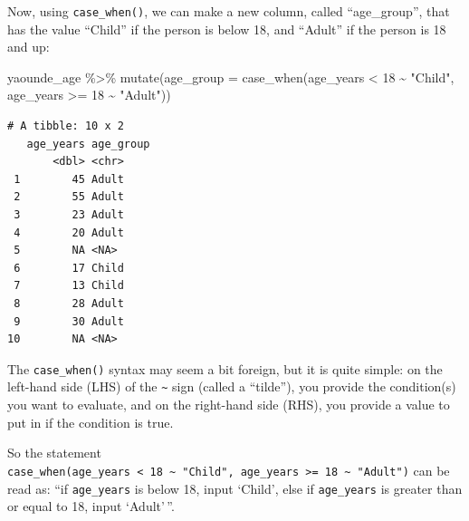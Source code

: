 \documentclass[
  letterpaper,
  DIV=11,
  numbers=noendperiod]{scrreprt}
\newenvironment{Shaded}{\begin{snugshade}}{\end{snugshade}}
\newcommand{\AttributeTok}[1]{\textcolor[rgb]{0.40,0.45,0.13}{#1}}
\newcommand{\DecValTok}[1]{\textcolor[rgb]{0.68,0.00,0.00}{#1}}
\newcommand{\FunctionTok}[1]{\textcolor[rgb]{0.28,0.35,0.67}{#1}}
\newcommand{\NormalTok}[1]{\textcolor[rgb]{0.00,0.23,0.31}{#1}}
\newcommand{\SpecialCharTok}[1]{\textcolor[rgb]{0.37,0.37,0.37}{#1}}
\newcommand{\StringTok}[1]{\textcolor[rgb]{0.13,0.47,0.30}{#1}}
\begin{document}
Now, using \texttt{case\_when()}, we can make a new column, called
``age\_group'', that has the value ``Child'' if the person is below 18,
and ``Adult'' if the person is 18 and up:

\begin{Shaded}
\begin{Highlighting}[]
\NormalTok{yaounde\_age }\SpecialCharTok{\%\textgreater{}\%}  
  \FunctionTok{mutate}\NormalTok{(}\AttributeTok{age\_group =} \FunctionTok{case\_when}\NormalTok{(age\_years }\SpecialCharTok{\textless{}} \DecValTok{18} \SpecialCharTok{\textasciitilde{}} \StringTok{"Child"}\NormalTok{, }
\NormalTok{                               age\_years }\SpecialCharTok{\textgreater{}=} \DecValTok{18} \SpecialCharTok{\textasciitilde{}} \StringTok{"Adult"}\NormalTok{))}
\end{Highlighting}
\end{Shaded}

\begin{verbatim}
# A tibble: 10 x 2
   age_years age_group
       <dbl> <chr>    
 1        45 Adult    
 2        55 Adult    
 3        23 Adult    
 4        20 Adult    
 5        NA <NA>     
 6        17 Child    
 7        13 Child    
 8        28 Adult    
 9        30 Adult    
10        NA <NA>     
\end{verbatim}

The \texttt{case\_when()} syntax may seem a bit foreign, but it is quite
simple: on the left-hand side (LHS) of the \texttt{\textasciitilde{}}
sign (called a ``tilde''), you provide the condition(s) you want to
evaluate, and on the right-hand side (RHS), you provide a value to put
in if the condition is true.

So the statement
\texttt{case\_when(age\_years\ \textless{}\ 18\ \textasciitilde{}\ "Child",\ age\_years\ \textgreater{}=\ 18\ \textasciitilde{}\ "Adult")}
can be read as: ``if \texttt{age\_years} is below 18, input `Child',
else if \texttt{age\_years} is greater than or equal to 18, input
`Adult'\,''.
\end{document}
